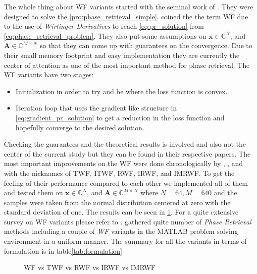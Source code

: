 The whole thing about \ac{WF} variants started with the seminal work of \cite{Candes2014}. They were designed to solve the \cref{pro:phase_retrieval_simple}. 
\cite{Candes2014} coined the the term \ac{WF} due to the use of \emph{Wirtinger Derivatives}\cite{Wirtinger1927} to reach \cref{eq:pr_solution} from \cref{eq:phase_retrieval_problem}. They 
also put some assumptions on $\boldsymbol{x} \in \mathbb{C}^N$, and $\boldsymbol{A} \in \mathbb{C}^{M \times N}$ so that they can 
come up with guarantees on the convergence. Due to their small memory footprint and easy implementation they are currently the center of attention as one of the 
most important method for phase retrieval.   
The \ac{WF} variants have two stages:
\begin{itemize}
  \item Initialization in order to try and be where the loss function is convex.
  \item Iteration loop that uses the gradient like structure in \cref{eq:gradient_pr_solution} to get a reduction in the 
  loss function and hopefully converge to the desired solution. 
\end{itemize}

Checking the guarantees and the theoretical results is involved and also not the center of the current study but they can be found in their respective papers. 
The most important improvements on the \ac{WF} were done chronologically by \cite{Chen2015}, \cite{Kolte2016}, and \cite{Zhang2016}
with the nicknames of \ac{TWF}, \ac{ITWF}, \ac{RWF}, \ac{IRWF}, and \ac{IMRWF}. To get the feeling of their performance compared to each other we implemented 
all of them and tested them on $\boldsymbol{x} \in \mathbb{C}^N$, and $\boldsymbol{A} \in \mathbb{C}^{M \times N}$ 
where $N = 64, M = 640$ and the samples were taken from the normal distribution centered at zero with the standard deviation of one. 
The results can be seen in \cref{fig:wf_variants}. For a quite extensive survey on \ac{WF} variants please refer to \cite{Liu2019}. \cite{Chandra2017} 
gathered quite number of \emph{Phase Retrieval} methods including a couple of \emph{\ac{WF}} variants in the MATLAB\textregistered\space 
problem solving environment in a uniform manner. The summary for all the variants in terms of formulation is in table\ref{tab:formulation}  

\begin{figure}
  \centering
\captionsetup{justification=centering}
  
\caption{\ac{WF} vs \ac{TWF} vs \ac{RWF} vs \ac{IRWF} vs \ac{IMRWF}}
  \label{fig:wf_variants}
\end{figure}






